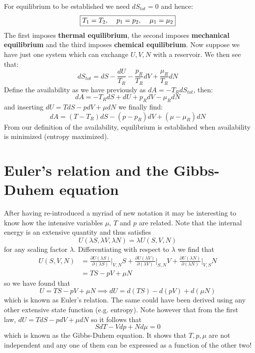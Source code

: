 \documentclass[a4paper,11pt,oneside]{book}
\begin{document}
For equilibrium to be established we need $dS_{tot}=0$ and hence:
\begin{equation}
    \boxed{T_1=T_2,\hspace{0.4cm} p_1=p_2,\hspace{0.4cm}\mu_1=\mu_2}
\end{equation}
The first imposes \textbf{thermal equilibrium}, the second imposes \textbf{mechanical equilibrium} and the third imposes \textbf{chemical equilibrium}. Now suppose we have just one system which can exchange $U,V,N$ with a reservoir. We then see that:
\begin{equation}
     dS_{tot} = dS - \frac{dU}{T_R}-\frac{p_R}{T_R}dV+ \frac{\mu_R}{T_R}dN
\end{equation}
Define the availability as we have previously as $dA = -T_R dS_{tot}$, then:
\begin{equation}
    dA = -T_R dS + dU + p_R dV - \mu_R dN
\end{equation}
and inserting $dU = TdS - p dV + \mu dN$ we finally find:
\begin{equation}
    \boxed{dA = (T-T_R)dS -(p-p_R)dV + (\mu-\mu_R)dN}
\end{equation}
From our definition of the availability, equilibrium is established when availability is minimized (entropy maximized).

\section{Euler's relation and the Gibbs-Duhem equation}
After having re-introduced a myriad of new notation it may be interesting to know how the intensive variables $\mu$, $T$ and $p$ are related. Note that the internal energy is an extensive quantity and thus satisfies
\begin{equation}
    U(\lambda S, \lambda V, \lambda N) = \lambda U(S,V,N)
\end{equation}
for any scaling factor $\lambda$. Differentiating with respect to $\lambda$ we find that
\begin{align}
   U(S,V,N) &= \frac{\partial U(\lambda S)}{\partial (\lambda S)}\bigg|_{V,N}S+\frac{\partial U(\lambda V)}{\partial (\lambda V)}\bigg|_{S,N}V+\frac{\partial U(\lambda N)}{\partial (\lambda N)}\bigg|_{V,S}N\\
   &=TS-pV+\mu N
\end{align}
so we have found that
\begin{equation}
    \boxed{U=TS-pV+\mu N} \implies dU = d(TS)-d(pV)+d(\mu N)
\end{equation}
which is known as Euler's relation. The same could have been derived using any other extensive state function (e.g. entropy). Note however that from the first law, $dU = TdS - pdV + \mu dN$ so it follows that
\begin{equation}
    \boxed{SdT - Vdp+Nd\mu = 0}
\end{equation}
which is known as the Gibbs-Duhem equation. It shows that $T,p,\mu$ are not independent and any one of them can be expressed as a function of the other two!
\end{document}
